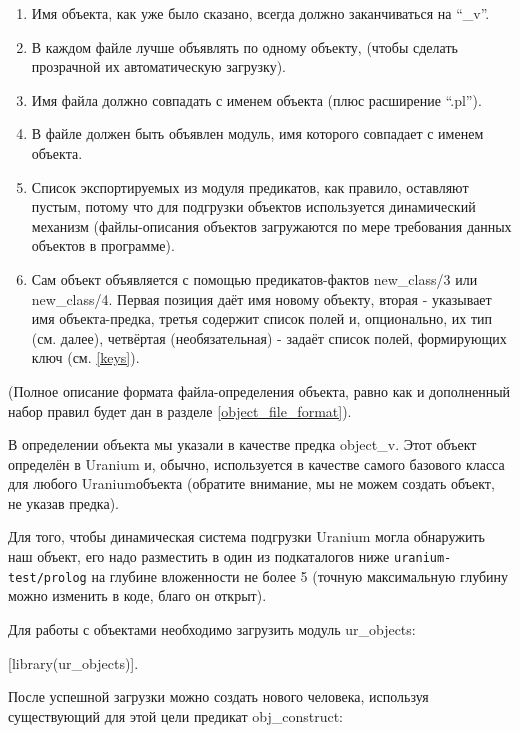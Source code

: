 \documentclass[a4paper]{book}
\def\ur{Uranium}
\begin{document}
\begin{enumerate}
\item Имя объекта, как уже было сказано, всегда должно
  заканчиваться на ``_v''.
\item В каждом файле лучше объявлять по одному объекту, (чтобы
  сделать прозрачной их автоматическую загрузку).
\item Имя файла должно совпадать с именем объекта (плюс
  расширение ``.pl'').
\item В файле должен быть объявлен модуль, имя которого совпадает
  с именем объекта.
\item Список экспортируемых из модуля предикатов, как правило,
  оставляют пустым, потому что для подгрузки объектов
  используется динамический механизм (файлы-описания объектов
  загружаются по мере требования данных объектов в программе).
\item Сам объект объявляется с помощью предикатов-фактов
  new_class/3 или new_class/4. Первая позиция даёт имя новому
  объекту, вторая - указывает имя объекта-предка, третья содержит
  список полей и, опционально, их тип (см. далее), четвёртая
  (необязательная) - задаёт список полей, формирующих ключ
  (см. \ref{keys}).
\end{enumerate}

(Полное описание формата файла-определения объекта, равно как и
дополненный набор правил будет дан в разделе
\ref{object_file_format}).

В определении объекта мы указали в качестве предка object_v. Этот
объект определён в \ur{} и, обычно, используется в качестве
самого базового класса для любого \ur объекта (обратите внимание,
мы не можем создать объект, не указав предка).

Для того, чтобы динамическая система подгрузки \ur{} могла
обнаружить наш объект, его надо разместить в один из подкаталогов
ниже \verb|uranium-test/prolog| на глубине вложенности не более 5
(точную максимальную глубину можно изменить в коде, благо он
открыт). 

Для работы с объектами необходимо загрузить модуль ur_objects:

\begin{example}{}{}
[library(ur_objects)].
\end{example}

После успешной загрузки можно создать нового человека, используя
существующий для этой цели предикат obj_construct:

\end{document}
